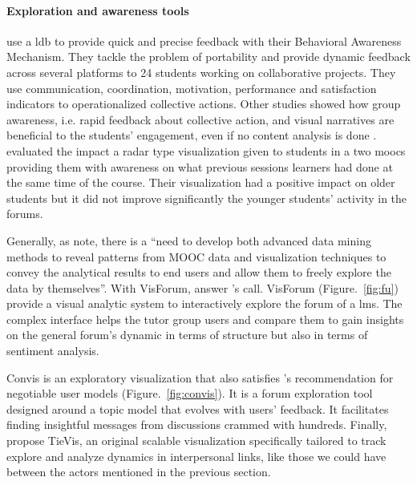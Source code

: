 \documentclass[a4paper,twoside]{article}
\begin{document}
\paragraph{Exploration and awareness tools}
\cite{Medina2016} use a \gls{ldb} to provide quick and precise feedback with their Behavioral Awareness Mechanism.  They tackle the problem of portability and provide dynamic feedback across several platforms to 24 students working on collaborative projects.  They use communication, coordination, motivation, performance and satisfaction indicators to operationalized collective actions.  Other studies showed how group awareness, i.e.  rapid feedback about collective action, and visual narratives \citep{Yousuf2015} are beneficial to the students' engagement, even if no content analysis is done \citep{Davis2017,May2011,Medina2016}.
\cite{Davis2017} evaluated the impact a radar type visualization given to students in a two \glspl{mooc} providing them with awareness on what previous sessions learners had done at the same time of the course.  Their visualization had a positive impact on older students but it did not improve significantly the younger students' activity in the forums.

Generally, as \cite{Qu2015} note, there is a ``need to develop both advanced data mining methods to reveal patterns from MOOC data and visualization techniques to convey the analytical results to end users and allow them to freely explore the data by themselves''.
With VisForum, \cite{Fu2017} answer \cite{Qu2015}'s call.  VisForum (Figure.~\ref{fig:fu}) provide a visual analytic system to interactively explore the forum of a \gls{lms}.  The complex interface helps the tutor group users and compare them to gain insights on the general forum's dynamic in terms of structure but also in terms of sentiment analysis.

Convis is an exploratory visualization that also satisfies \cite{Bull2016}'s recommendation for negotiable user models (Figure.~\ref{fig:convis}).  It is a forum exploration tool designed around a topic model that evolves with users' feedback.   It facilitates finding insightful messages from discussions
crammed with hundreds.
Finally, \cite{Guo2017} propose TieVis, an original scalable visualization specifically tailored to track explore and analyze dynamics in interpersonal links, like those we could have between the actors mentioned in the previous section.
\end{document}
